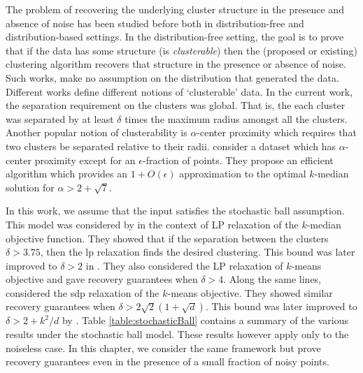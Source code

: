 \documentclass[12pt]{article}
\begin{document}
The problem of recovering the underlying cluster structure in the presence and absence of noise has been studied before both in distribution-free and distribution-based settings. In the distribution-free setting, the goal is to prove that if the data has some structure (is {\em clusterable}) then the (proposed or existing) clustering algorithm recovers that structure in the presence or absence of noise. Such works, make no assumption on the distribution that generated the data. Different works define different notions of `clusterable' data. In the current work, the separation requirement on the clusters was global. That is, the each cluster was separated by at least $\delta$ times the maximum radius amongst all the clusters. Another popular notion of clusterability is $\alpha$-center proximity \cite{awasthi2012center} which requires that two clusters be separated relative to their radii. \cite{balcan2012clustering} consider a dataset which has $\alpha$-center proximity except for an $\epsilon$-fraction of points. They propose an efficient algorithm which provides an $1+O(\epsilon)$ approximation to the optimal $k$-median solution for $\alpha > 2 + \sqrt{7}$.

In this work, we assume that the input satisfies the stochastic ball assumption. This model was considered by \cite{nellore2015recovery} in the context of LP relaxation of the $k$-median objective function. They showed that if the separation between the clusters $\delta > 3.75$, then the lp relaxation finds the desired clustering. This bound was later improved to $\delta > 2$ in \cite{awasthi2015relax}. They also considered the LP relaxation of $k$-means objective and gave recovery guarantees when $\delta > 4$. Along the same lines, \cite{awasthi2015relax} considered the sdp relaxation of the $k$-means objective. They showed similar recovery guarantees when $\delta > 2\sqrt 2 (1 + \sqrt d)$. This bound was later improved to $\delta > 2 + k^2/d$ by \cite{iguchi2017probably}. Table \ref{table:stochasticBall} contains a summary of the various results under the stochastic ball model. These results however apply only to the noiseless case. In this chapter, we consider the same framework but prove recovery guarantees even in the presence of a small fraction of noisy points. 
\end{document}
